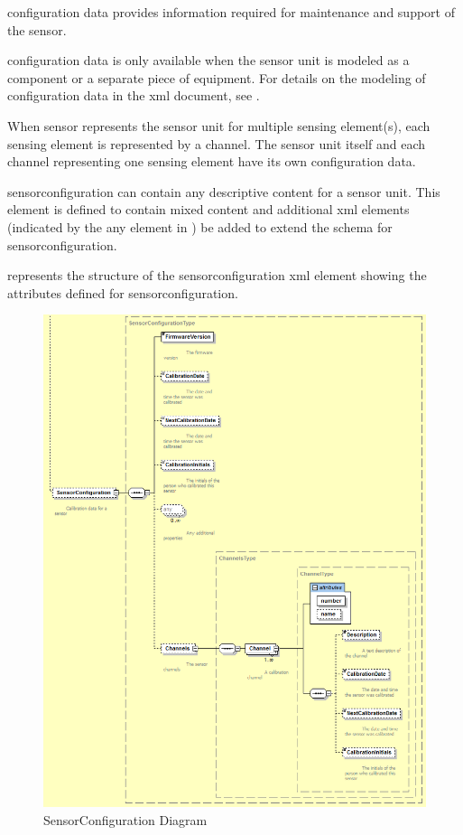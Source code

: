 \gls{configuration} data provides information required for maintenance and support of the sensor.

\gls{configuration} data is only available when the \gls{sensor} unit is modeled as a \gls{component} or a separate piece of equipment. For details on the modeling of configuration data in the \gls{xml} document, see .

When \gls{sensor} represents the \gls{sensor unit} for multiple \gls{sensing element}(s), each sensing element is represented by a \gls{channel}.   The \gls{sensor unit} itself and each \gls{channel} representing one \gls{sensing element} \may have its own configuration data.

\gls{sensorconfiguration} can contain any descriptive content for a \gls{sensor unit}.  This element is defined to contain mixed content and additional \gls{xml} elements (indicated by the \gls{any} element in ) \may be added to extend the schema for \gls{sensorconfiguration}.

 represents the structure of the \gls{sensorconfiguration} \gls{xml} element showing the attributes defined for \gls{sensorconfiguration}. 

\begin{figure}[ht]
  \centering
  \includegraphics[width=.75\textwidth]{figures/sensorconfiguration-schema-diagram.png}
  \caption{SensorConfiguration Diagram}
  \label{fig:sensorconfiguration-schema-diagram}
\end{figure}
\FloatBarrier


